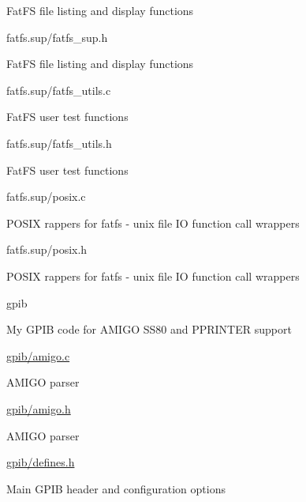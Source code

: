 \begin{DoxyItemize}
\begin{DoxyItemize}
\begin{DoxyItemize}
\item Fat\+FS file listing and display functions
\end{DoxyItemize}
\item fatfs.\+sup/fatfs\+\_\+sup.h
\begin{DoxyItemize}
\item Fat\+FS file listing and display functions
\end{DoxyItemize}
\item fatfs.\+sup/fatfs\+\_\+utils.c
\begin{DoxyItemize}
\item Fat\+FS user test functions
\end{DoxyItemize}
\item fatfs.\+sup/fatfs\+\_\+utils.h
\begin{DoxyItemize}
\item Fat\+FS user test functions
\end{DoxyItemize}
\item fatfs.\+sup/posix.c
\begin{DoxyItemize}
\item P\+O\+S\+IX rappers for fatfs -\/ unix file IO function call wrappers
\end{DoxyItemize}
\item fatfs.\+sup/posix.h
\begin{DoxyItemize}
\item P\+O\+S\+IX rappers for fatfs -\/ unix file IO function call wrappers
\end{DoxyItemize}
\end{DoxyItemize}
\item gpib
\begin{DoxyItemize}
\item My G\+P\+IB code for A\+M\+I\+GO S\+S80 and P\+P\+R\+I\+N\+T\+ER support
\item \hyperlink{amigo_8c}{gpib/amigo.\+c}
\begin{DoxyItemize}
\item A\+M\+I\+GO parser
\end{DoxyItemize}
\item \hyperlink{amigo_8h}{gpib/amigo.\+h}
\begin{DoxyItemize}
\item A\+M\+I\+GO parser
\end{DoxyItemize}
\item \hyperlink{defines_8h}{gpib/defines.\+h}
\begin{DoxyItemize}
\item Main G\+P\+IB header and configuration options

\end{DoxyItemize}
\end{DoxyItemize}
\end{DoxyItemize}
